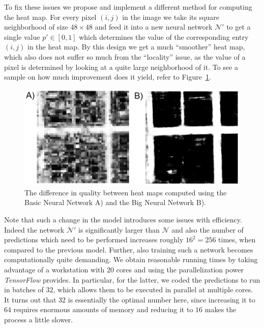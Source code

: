 \documentclass[10pt,conference,compsocconf]{IEEEtran}
\newcommand{\cN}{\mathcal{N}}
\begin{document}
To fix these issues we propose and implement a different method for computing the heat map. For every pixel $(i,j)$ in the image we take its square neighborhood of size $48\times 48$ and feed it into a new neural network $\cN'$ to get a single value $p'\in [0,1]$ which determines the value of the corresponding entry $(i,j)$ in the heat map. By this design we get a much ``smoother'' heat map, which also does not suffer so much from the ``locality'' issue, as the value of a pixel is determined by looking at a quite large neighborhood of it. To see a sample on how much improvement does it yield, refer to Figure~\ref{fig:smallbig}.
\begin{figure}
\includegraphics[scale=0.42]{smallbig.png}
\caption{The difference in quality between heat maps computed using the Basic Neural Network A) and the Big Neural Network B).}
\label{fig:smallbig}
\end{figure}
Note that such a change in the model introduces some issues with efficiency. Indeed the network $\cN'$ is significantly larger than $\cN$ and also the number of predictions which need to be performed increases roughly $16^2=256$ times, when compared to the previous model. Further, also training such a network becomes computationally quite demanding. We obtain reasonable running times by taking advantage of a workstation with 20 cores and using the parallelization power {\it TensorFlow} provides. In particular, for the latter, we coded the predictions to run in batches of $32$, which allows them to be executed in parallel at multiple cores. It turns out that $32$ is essentially the optimal number here, since increasing it to $64$ requires enormous amounts of memory and reducing it to $16$ makes the process a little slower.
\end{document}
